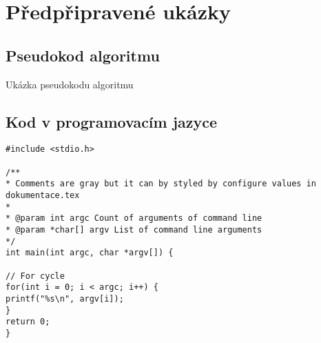 \section{Předpřipravené ukázky}

\subsection{Pseudokod algoritmu}

\begin{algorithm}[h]
    \caption{Ukázka pseudokodu algoritmu}
\end{algorithm}

\subsection{Kod v programovacím jazyce}

\begin{lstlisting}[caption = Print arguments of command line]
#include <stdio.h>

/**
* Comments are gray but it can by styled by configure values in dokumentace.tex
*
* @param int argc Count of arguments of command line
* @param *char[] argv List of command line arguments
*/
int main(int argc, char *argv[]) {

// For cycle
for(int i = 0; i < argc; i++) {
printf("%s\n", argv[i]);
}
return 0;
}
\end{lstlisting}